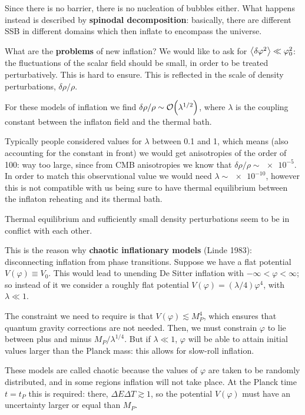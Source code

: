 \documentclass[main.tex]{subfiles}
\begin{document}
Since there is no barrier, there is no nucleation of bubbles either.
What happens instead is described by \textbf{spinodal decomposition}: basically, there are different SSB in different domains which then inflate to encompass the universe.

What are the \textbf{problems} of new inflation?
We would like to ask for \(\expval{ \delta \varphi^2} \ll \varphi_0^2\): the fluctuations of the scalar field should be small, in order to be treated perturbatively. 
This is hard to ensure. This is reflected in the scale of density perturbations, \(\delta \rho / \rho \). 

For these models of inflation we find \(\delta \rho / \rho \sim \order{\lambda^{1/2}}\), where \(\lambda \) is the coupling constant between the inflaton field and the thermal bath.

Typically people considered values for \(\lambda \) between \num{.1} and \num{1}, which means (also accounting for the constant in front) we would get anisotropies of the order of 100:
way too large, since from CMB anisotropies we know that \(\delta \rho / \rho \sim \num{e-5}\).
In order to match this observational value we would need \(\lambda \sim \num{e-10}\), however this is not compatible with us being sure to have thermal equilibrium between the inflaton reheating and its thermal bath. 

Thermal equilibrium and sufficiently small density perturbations seem to be in conflict with each other. 

This is the reason why \textbf{chaotic inflationary models} (Linde 1983): disconnecting inflation from phase transitions. 
Suppose we have a flat potential \(V(\varphi ) \equiv V_0 \). 
This would lead to unending De Sitter inflation with \(- \infty < \varphi < \infty \); so instead of it we consider a roughly flat potential \(V(\varphi ) = (\lambda /4) \varphi^{4}\), with \(\lambda \ll 1\). 

The constraint we need to require is that \(V(\varphi ) \lesssim M_P^{4}\), which ensures that quantum gravity corrections are not needed.
Then, we must constrain \(\varphi \) to lie between plus and minus \(M_P / \lambda^{1/4}\). 
But if \(\lambda \ll 1\), \(\varphi \) will be able to attain initial values larger than the Planck mass: this allows for slow-roll inflation. 

These models are called chaotic because the values of \(\varphi \) are taken to be randomly distributed, and in some regions inflation will not take place. 
At the Planck time \(t = t_P\) this is required: there, \(\Delta E \Delta T \gtrsim 1\), so the potential \(V(\varphi )\) must have an uncertainty larger or equal than \(M_P\). 
\end{document}
